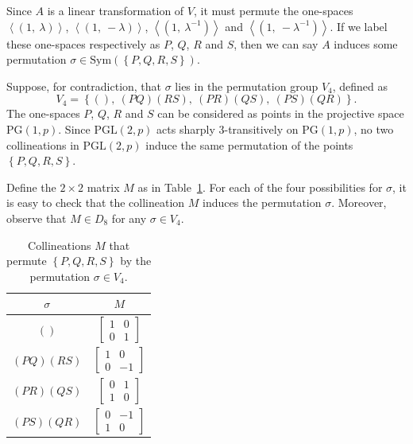 \documentclass[ALCO, Unicode]{cedram}
\newcommand{\PG}{\mathrm{PG}}
\newcommand{\PGL}{\mathrm{PGL}}
\newcommand{\Sym}{\mathrm{Sym}}
\begin{document}
Since $A$ is a linear transformation of $V$, it must permute the one-spaces $\left<\left(1,\ \lambda \right)\right>$, $\left<\left(1,\ -\lambda \right)\right>$, $\left<\left(1,\ \lambda^{-1} \right)\right>$ and $\left<\left(1,\ -\lambda^{-1} \right)\right>$. If we label these one-spaces respectively as $P$, $Q$, $R$ and $S$, then we can say $A$ induces some permutation $\sigma \in \Sym(\left\{P, Q, R, S \right\})$.

Suppose, for contradiction, that $\sigma$ lies in the permutation group $V_4$, defined as
\begin{displaymath}
V_4 = {\left\{(),\ {\left(PQ \right)}{\left(RS \right)},\ {\left(PR \right)}{\left(QS \right)},\ {\left(PS \right)}{\left(QR \right)} \right\}}.
\end{displaymath}
The one-spaces $P$, $Q$, $R$ and $S$ can be considered as points in the projective space $\PG{\left(1, p \right)}$. Since $\PGL{\left(2, p \right)}$ acts sharply $3$-transitively on $\PG{\left(1, p \right)}$, no two collineations in $\PGL{\left(2, p \right)}$ induce the same permutation of the points $\left\{P, Q, R, S \right\}$.

Define the $2 \times 2$ matrix $M$ as in Table~\ref{tbl:V_4-collineations}. For each of the four possibilities for $\sigma$, it is easy to check that the collineation $M$ induces the permutation $\sigma$. Moreover, observe that $M \in D_8$ for any $\sigma \in V_4$.

\begin{table}
\centering
\begin{tabular}{cc}
\hline
$\sigma$ & $M$ \\
\hline
\vphantom{\Bigg(}$()$ & $\begin{bmatrix} 1 & 0 \\ 0 & 1 \end{bmatrix}$ \\
\vphantom{\Bigg(}${\left(PQ \right)}{\left(RS \right)}$ & $\begin{bmatrix} 1 & 0 \\ 0 & -1 \end{bmatrix}$ \\
\vphantom{\Bigg(}${\left(PR \right)}{\left(QS \right)}$ & $\begin{bmatrix} 0 & 1 \\ 1 & 0 \end{bmatrix}$ \\
\vphantom{\Bigg(}${\left(PS \right)}{\left(QR \right)}$ & $\begin{bmatrix} 0 & -1 \\ 1 & 0 \end{bmatrix}$ \\
\hline
\end{tabular}
\caption{Collineations $M$ that permute $\left\{P, Q, R, S \right\}$ by the permutation $\sigma \in V_4$.}
\label{tbl:V_4-collineations}
\end{table}
\end{document}
